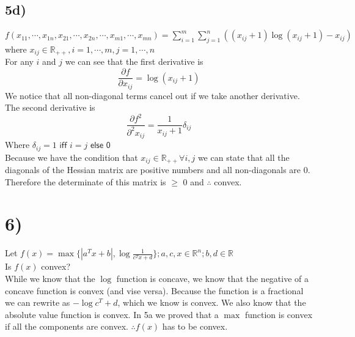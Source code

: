 \documentclass[12pt,letter]{article}
\begin{document}
\subsection*{5d)}
$f(x_{11},\cdots,x_{1n},x_{21},\cdots,x_{2n},\cdots,x_{m1},\cdots,x_{mn}) =
\sum\limits_{i=1}^m\sum\limits_{j=1}^n((x_{ij} + 1)\log(x_{ij}+1) - x_{ij})$
where $x_{ij}\in\mathbb{R}_{++}, i = 1,\cdots,m, j=1,\cdots,n$
\\
For any $i$ and $j$ we can see that the first derivative is
\[
    \frac{\partial f}{\partial x_{ij}} = \log(x_{ij} + 1)
\]
We notice that all non-diagonal terms cancel out if we take another derivative. 
The second derivative is
\[
    \frac{\partial f^2}{\partial^2 x_{ij}} = \frac{1}{x_{ij}+1}\delta_{ij}
\]
Where $\delta_{ij} = 1 \textsf{ iff } i=j \textsf{ else 0}$\\
Because we have the condition that $x_{ij}\in\mathbb{R}_{++} \forall i,j$ we can
state that all the diagonals of the Hessian matrix are positive numbers and all
non-diagonals are 0. Therefore the determinate of this matrix is $\geq$ 0 and
$\therefore$ convex.

\section*{6)}
Let $f(x)=\max\{|a^Tx+b|,\log\frac{1}{c^Tx+d}\}; a,c,x\in\mathbb{R}^n; b,d\in\mathbb{R}$ \\
Is $f(x)$ convex? 
\\
While we know that the $\log$ function is concave, we know that the negative of
a concave function is convex (and vise versa). Because the function is a fractional
we can rewrite as $-\log{c^T+d}$, which we know is convex.
We also know that the absolute value function is convex.
In 5a we proved that a $\max$ function is convex if all the components are convex.
$\therefore f(x)$ has to be convex.
\end{document}
